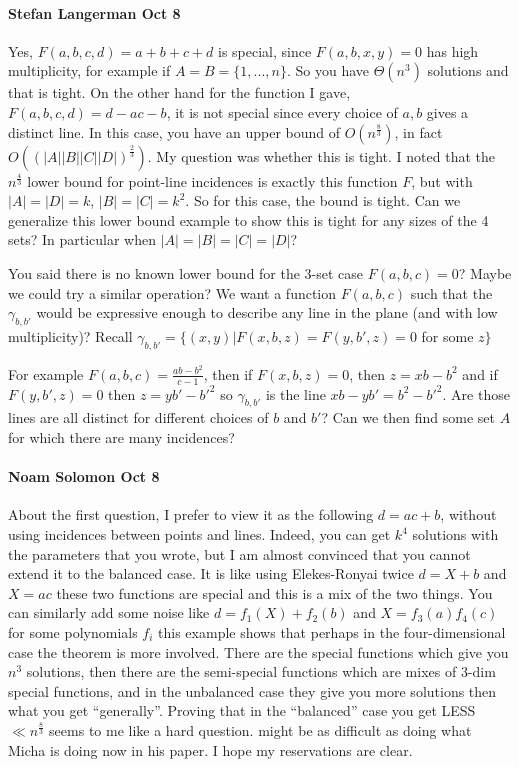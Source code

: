 \paragraph{Stefan Langerman Oct 8}
Yes, $F(a,b,c,d)=a+b+c+d$ is special, since $F(a,b,x,y)=0$ has high
multiplicity, for example if $A = B = \{1,...,n\}$. So you have $\Theta(n^3)$
solutions and that is tight.
On the other hand for the function I gave, $F(a,b,c,d) = d-ac-b$, it is
not special since every choice of $a,b$ gives a distinct line. In this
case, you have an upper bound of $O(n^{\frac{8}{3}})$, in fact
$O((|A||B||C||D|)^{\frac{2}{3}})$. My question was whether this is tight. I
noted that the $n^{\frac{4}{3}}$ lower bound for point-line incidences is exactly
this function $F$, but with $|A|=|D|=k$, $|B|=|C|=k^2$. So for this case,
the bound is tight. Can we generalize this lower bound example to show
this is tight for any sizes of the 4 sets? In particular when
$|A|=|B|=|C|=|D|$?

You said there is no known lower bound for the 3-set case $F(a,b,c)=0$?
Maybe we could try a similar operation?
We want a function $F(a,b,c)$ such that the $\gamma_{b,b'}$ would be
expressive enough to describe any line in the plane (and with low
multiplicity)?
Recall $\gamma_{b,b'} = \{(x,y)|F(x,b,z)=F(y,b',z)=0$ for some $z\}$

For example $F(a,b,c)= \frac{ab-b^2}{c-1}$, then if $F(x,b,z)=0$, then $z=xb-b^2$
and if $F(y,b',z)=0$ then $z = yb'-b'^2$ so $\gamma_{b,b'}$ is the line
$xb-yb'=b^2-b'^2$. Are those lines are all distinct for different
choices of $b$ and $b'$? Can we then find some set $A$ for which there are
many incidences?

\paragraph{Noam Solomon Oct 8}
About the first question, I prefer to view it as the following
$d=ac+b$, without using incidences between points and lines.
Indeed, you can get $k^4$ solutions with the parameters that you wrote, but I
am almost convinced that you cannot extend it to the balanced case. It is
like using Elekes-Ronyai twice
$d = X + b$ and $X = ac$
these two functions are special and this is a mix of the two things. You
can similarly add some noise like
$d = f_1(X) + f_2(b)$ and $X = f_3(a)f_4(c)$
for some polynomials $f_i$
this example shows that perhaps in the four-dimensional case the theorem is
more involved.
There are the special functions which give you $n^3$ solutions,
then there are the semi-special functions which are mixes of 3-dim special
functions, and in the unbalanced case they give you more solutions then
what you get ``generally''.
Proving that in the ``balanced'' case you get LESS $\ll n^{\frac{8}{3}}$ seems to me
like a hard question. might be as difficult as doing what Micha is doing
now in his paper. I hope my reservations are clear.


